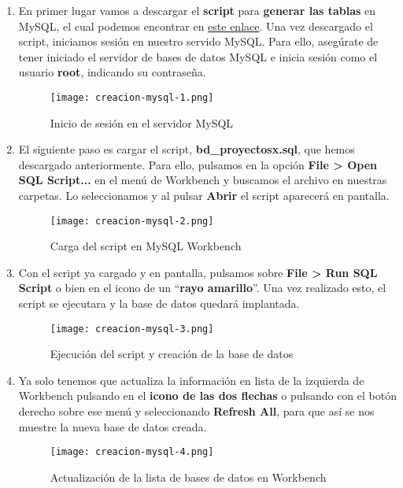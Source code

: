 \begin{enumerate}
    \item En primer lugar vamos a descargar el \textbf{script} para \textbf{generar las tablas} en MySQL, el cual podemos encontrar en \href{https://github.com/fcosueza/DAW/blob/main/BD/Apuntes/archivos/tema4-script-mysql.zip}{este enlace}. Una vez descargado el script, iniciamos sesión en nuestro servido MySQL. Para ello, asegúrate de tener iniciado el servidor  de bases de datos MySQL e inicia sesión como el usuario \textbf{root}, indicando su contraseña.

    \begin{figure}[H]
        \centering
        \texttt{[image: creacion-mysql-1.png]}
        \caption{Inicio de sesión en el servidor MySQL}
    \end{figure}

    \item El siguiente paso es cargar el script, \textbf{bd\_proyectosx.sql}, que hemos descargado anteriormente. Para ello, pulsamos en la opción \textbf{File > Open SQL Script...} en el menú de Workbench y buscamos el archivo en nuestras carpetas. Lo seleccionamos y al pulsar \textbf{Abrir} el script aparecerá en pantalla.

    \begin{figure}[H]
        \centering
        \texttt{[image: creacion-mysql-2.png]}
        \caption{Carga del script en MySQL Workbench}
    \end{figure}

    \item Con el script ya cargado y en pantalla, pulsamos sobre \textbf{File > Run SQL Script} o bien en el icono de un ``\textbf{rayo amarillo}''. Una vez realizado esto, el script se ejecutara y la base de datos quedará implantada.

    \begin{figure}[H]
        \centering
        \texttt{[image: creacion-mysql-3.png]}
        \caption{Ejecución del script y creación de la base de datos}
    \end{figure}

    \item Ya solo tenemos que actualiza la información en lista de la izquierda de Workbench pulsando en el \textbf{icono de las dos flechas} o pulsando con el botón derecho sobre ese menú y seleccionando \textbf{Refresh All}, para que así se nos muestre la nueva base de datos creada.

    \begin{figure}[H]
        \centering
        \texttt{[image: creacion-mysql-4.png]}
        \caption{Actualización de la lista de bases de datos en Workbench}
    \end{figure}
\end{enumerate}

